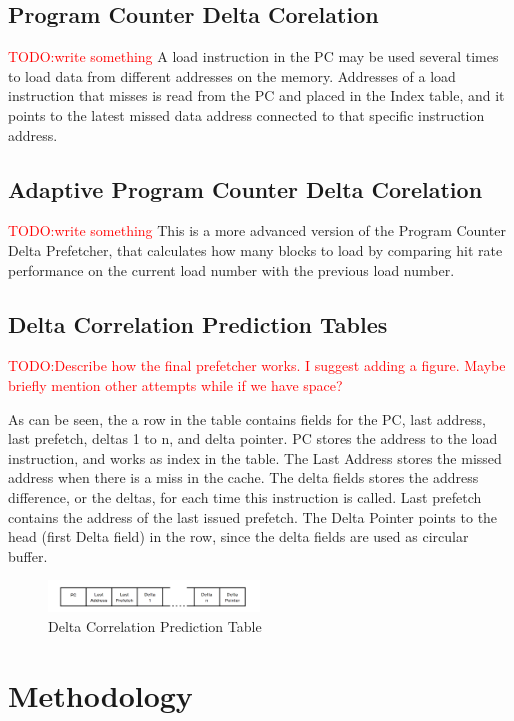 \documentclass[a4paper]{IEEEtran}
\newcommand\TODO[1]{\textcolor{red}{TODO:#1}}
\newcommand\todo[1]{\TODO{#1}}
\begin{document}
\subsection{Program Counter Delta Corelation}
\todo{write something}
A load instruction in the PC may be used several times to load data from different addresses on the memory.
Addresses of a load instruction that misses is read from the PC and placed in the Index table, and it points to the latest missed data address connected to that specific instruction address. 

\subsection{Adaptive Program Counter Delta Corelation}
\todo{write something}
This is a more advanced version of the Program Counter Delta Prefetcher, that calculates how many blocks to load by comparing hit rate performance on the current load number with the previous load number.

\subsection{Delta Correlation Prediction Tables}

\todo{Describe how the final prefetcher works. I suggest adding a figure. Maybe briefly mention other attempts while if we have space?}


As can be seen, the a row in the table contains fields for the PC, last address, last prefetch, deltas 1 to n, and delta pointer.
PC stores the address to the load instruction, and works as index in the table.
The Last Address stores the missed address when there is a miss in the cache.
The delta fields stores the address difference, or the deltas, for each time this instruction is called.
Last prefetch contains the address of the last issued prefetch.
The Delta Pointer points to the head (first Delta field) in the row, since the delta fields are used as circular buffer.

\begin{figure}[h!]
  \centering
      \includegraphics[width=0.5\textwidth]{Figures/DCTable}
  \caption{Delta Correlation Prediction Table}
  \label{fig:DCTable}
\end{figure}

\section{Methodology}
\end{document}
